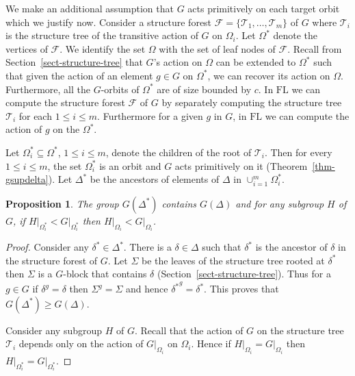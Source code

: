 \documentclass[11pt]{madras}%
\newtheorem{proposition}[theorem]{Proposition}
\theoremstyle{remark}
\newcommand{\pr}[2]{{\ensuremath{\left.{#1}\right\vert_{#2}}}}
\newcommand{\pointwise}[2]{{\ensuremath{#1\left(#2\right)}}}
\begin{document}
We make an additional assumption that $G$ acts primitively on each
target orbit which we justify now.  Consider a structure forest
$\mathcal{F} = \{ \mathcal{T}_1,\ldots,\mathcal{T}_m\}$ of $G$ where
$\mathcal{T}_i$ is the structure tree of the transitive action of $G$
on $\Omega_i$.  Let $\Omega^*$ denote the vertices of $\mathcal{F}$.
We identify the set $\Omega$ with the set of leaf nodes of
$\mathcal{F}$.  Recall from Section~\ref{sect-structure-tree} that
$G$'s action on $\Omega$ can be extended to $\Omega^*$ such that given
the action of an element $g \in G$ on $\Omega^*$, we can recover its
action on $\Omega$. Furthermore, all the $G$-orbits of $\Omega^*$ are
of size bounded by $c$.  In $\mathrm{FL}$ we can compute the structure
forest $\mathcal{F}$ of $G$ by separately computing the structure tree
$\mathcal{T}_i$ for each $1 \leq i \leq m$.  Furthermore for a given
$g$ in $G$, in $\mathrm{FL}$ we can compute the action of $g$ on the
$\Omega^*$.

Let $\Omega_i^* \subseteq \Omega^*$, $1\leq i \leq m$, denote the
children of the root of $\mathcal{T}_i$. Then for every $1 \leq i \leq
m$, the set $\Omega_i^*$ is an orbit and $G$ acts primitively on it
(Theorem~\ref{thm-gsupdelta}).  Let $\Delta^*$ be the ancestors of
elements of $\Delta$ in $\cup_{i=1}^m \Omega_i^*$.

\begin{proposition}\label{prop-target-primitive}
  The group $\pointwise{G}{\Delta^*}$ contains $\pointwise{G}{\Delta}$
  and for any subgroup $H$ of $G$, if $\pr{H}{\Omega_i^*} <
  \pr{G}{\Omega_i^*}$ then $\pr{H}{\Omega_i} < \pr{G}{\Omega_i}$.
\end{proposition}
\begin{proof}
  Consider any $\delta^* \in \Delta^*$. There is a $\delta \in \Delta$
  such that $\delta^*$ is the ancestor of $\delta$ in the structure
  forest of $G$. Let $\Sigma$ be the leaves of the structure tree
  rooted at $\delta^*$ then $\Sigma$ is a $G$-block that contains
  $\delta$ (Section~\ref{sect-structure-tree}). Thus for a $g \in G$
  if $\delta^g = \delta$ then $\Sigma^g = \Sigma$ and hence
  ${\delta^*}^g = \delta^*$. This proves that $\pointwise{G}{\Delta^*}
  \geq \pointwise{G}{\Delta}$.

  Consider any subgroup $H$ of $G$. Recall that the action of $G$ on
  the structure tree $\mathcal{T}_i$ depends only on the action of
  $\pr{G}{\Omega_i}$ on $\Omega_i$. Hence if $\pr{H}{\Omega_i} =
  \pr{G}{\Omega_i}$ then $\pr{H}{\Omega_i^*} = \pr{G}{\Omega_i^*}$.
\end{proof}
\end{document}
